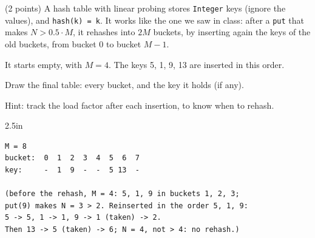 \begin{question}
(2 points) A hash table with linear probing stores \lstinline|Integer| keys (ignore the values), and \lstinline|hash(k) = k|. It works like the one we saw in class: after a \lstinline|put| that makes $N > 0.5 \cdot M$, it rehashes into $2M$ buckets, by inserting again the keys of the old buckets, from bucket 0 to bucket $M-1$.

It starts empty, with $M = 4$. The keys 5, 1, 9, 13 are inserted in this order.

Draw the final table: every bucket, and the key it holds (if any).

Hint: track the load factor after each insertion, to know when to rehash.

\begin{answerspace}{2.5in}
\ifanswers
\begin{verbatim}
M = 8
bucket:  0  1  2  3  4  5  6  7
key:     -  1  9  -  -  5 13  -

(before the rehash, M = 4: 5, 1, 9 in buckets 1, 2, 3;
put(9) makes N = 3 > 2. Reinserted in the order 5, 1, 9:
5 -> 5, 1 -> 1, 9 -> 1 (taken) -> 2.
Then 13 -> 5 (taken) -> 6; N = 4, not > 4: no rehash.)
\end{verbatim}
\fi
\end{answerspace}
\end{question}

